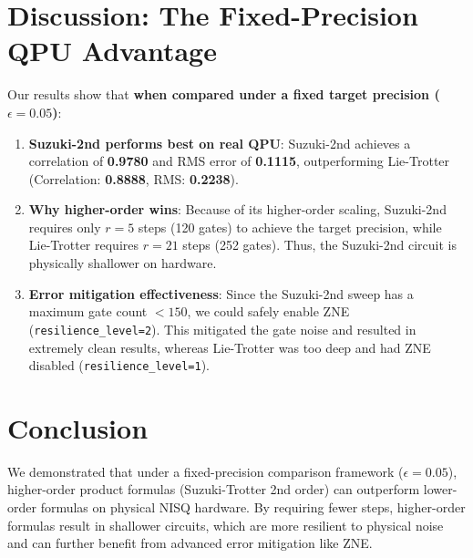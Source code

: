 \documentclass[11pt,a4paper]{article}
\begin{document}
\section{Discussion: The Fixed-Precision QPU Advantage}

Our results show that \textbf{when compared under a fixed target precision ($\epsilon=0.05$)}:
\begin{enumerate}
    \item \textbf{Suzuki-2nd performs best on real QPU}: Suzuki-2nd achieves a correlation of \textbf{0.9780} and RMS error of \textbf{0.1115}, outperforming Lie-Trotter (Correlation: \textbf{0.8888}, RMS: \textbf{0.2238}).
    \item \textbf{Why higher-order wins}: Because of its higher-order scaling, Suzuki-2nd requires only $r=5$ steps (120 gates) to achieve the target precision, while Lie-Trotter requires $r=21$ steps (252 gates). Thus, the Suzuki-2nd circuit is physically shallower on hardware.
    \item \textbf{Error mitigation effectiveness}: Since the Suzuki-2nd sweep has a maximum gate count $< 150$, we could safely enable ZNE (\texttt{resilience\_level=2}). This mitigated the gate noise and resulted in extremely clean results, whereas Lie-Trotter was too deep and had ZNE disabled (\texttt{resilience\_level=1}).
\end{enumerate}

\section{Conclusion}

We demonstrated that under a fixed-precision comparison framework ($\epsilon=0.05$), higher-order product formulas (Suzuki-Trotter 2nd order) can outperform lower-order formulas on physical NISQ hardware. By requiring fewer steps, higher-order formulas result in shallower circuits, which are more resilient to physical noise and can further benefit from advanced error mitigation like ZNE.
\end{document}

